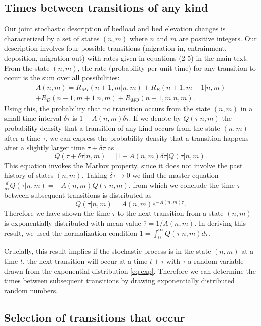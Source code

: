 \documentclass[11pt]{article}
\newcommand\be{\begin{equation}} %
\newcommand\ee{\end{equation}}   %
\begin{document}
\subsection*{Times between transitions of any kind}
Our joint stochastic description of bedload and bed elevation changes is characterized by a set of states $(n,m)$ where $n$ and $m$ are positive integers. 
Our description involves four possible transitions (migration in, entrainment, deposition, migration out) with rates given in equations (2-5) in the main text.
From the state $(n,m)$, the rate (probability per unit time) for any transition to occur is the sum over all possibilities:
\begin{multline} A(n,m) = R_{MI}(n+1,m|n,m) + R_E(n+1,m-1|n,m) \\+ R_D(n-1,m+1|n,m) + R_{MO}(n-1,m|n,m).\end{multline}
Using this, the probability that no transition occurs from the state $(n,m)$ in a small time interval $\delta \tau$ is $1-A(n,m)\delta \tau$. If we denote by $Q(\tau|n,m)$ the probability density that a transition of any kind occurs from the state $(n,m)$ after a time $\tau$, we can express the probability density that a transition happens after a slightly larger time $\tau + \delta \tau$ as 
\be Q(\tau+\delta \tau|n,m) = \big[1-A(n,m)\delta \tau\big]Q(\tau|n,m).\ee
This equation invokes the Markov property, since it does not involve the past history of states $(n,m)$. Taking $\delta\tau \rightarrow 0 $ we find the master equation $\frac{d}{d\tau}Q(\tau|n,m) = -A(n,m)Q(\tau|n,m)$, from which we conclude the time $\tau$ between subsequent transitions is distributed as 
\be Q(\tau|n,m) = A(n,m)e^{-A(n,m)\tau}. \label{eq:exp}\ee
Therefore we have shown the time $\tau$ to the next transition from a state $(n,m)$ is exponentially distributed with mean value $\bar{\tau} = 1/A(n,m).$ In deriving this result, we used the normalization condition $1 = \int_0^\infty Q(\tau|n,m)d\tau.$

Crucially, this result implies if the stochastic process is in the state $(n,m)$ at a time $t$, the next transition will occur at a time $t+\tau$ with $\tau$ a random variable drawn from the exponential distribution \ref{eq:exp}.
Therefore we can determine the times between subsequent transitions by drawing exponentially distributed random numbers.

\subsection*{Selection of transitions that occur}
\end{document}
